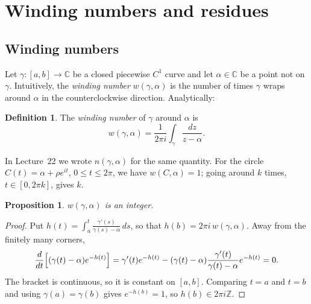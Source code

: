 \documentclass[11pt]{article}
\theoremstyle{plain}
\newtheorem{proposition}[theorem]{Proposition}
\theoremstyle{definition}
\newtheorem{definition}[theorem]{Definition}
\theoremstyle{remark}
\numberwithin{equation}{section}
\newcommand{\C}{\mathbb{C}}
\newcommand{\Z}{\mathbb{Z}}
\begin{document}
\section{Winding numbers and residues}\label{sec:winding}
\subsection{Winding numbers}
Let $\gamma\colon[a,b]\to\C$ be a closed piecewise $C^1$ curve and let
$\alpha\in\C$ be a point not on $\gamma$. Intuitively, the \emph{winding
number} $w(\gamma,\alpha)$ is the number of times $\gamma$ wraps around
$\alpha$ in the counterclockwise direction. Analytically:

\begin{definition}
The \emph{winding number} of $\gamma$ around $\alpha$ is
\begin{equation}
 w(\gamma,\alpha)=\frac{1}{2\pi i}\int_\gamma\frac{dz}{z-\alpha}.
\end{equation}
\end{definition}
In Lecture~22 we wrote $n(\gamma,\alpha)$ for the same quantity. For the
circle $C(t)=\alpha+\rho e^{it}$, $0\leq t\leq2\pi$, we have
$w(C,\alpha)=1$; going around $k$ times, $t\in[0,2\pi k]$, gives $k$.

\begin{proposition}\label{prop:winding-integer}
$w(\gamma,\alpha)$ is an integer.
\end{proposition}
\begin{proof}
Put $h(t)=\int_a^t\frac{\gamma'(s)}{\gamma(s)-\alpha}\,ds$, so that
$h(b)=2\pi i\,w(\gamma,\alpha)$. Away from the finitely many corners,
\begin{equation}
 \frac{d}{dt}\Bigl[(\gamma(t)-\alpha)e^{-h(t)}\Bigr]
 =\gamma'(t)e^{-h(t)}-(\gamma(t)-\alpha)\frac{\gamma'(t)}{\gamma(t)-\alpha}e^{-h(t)}=0.
\end{equation}
The bracket is continuous, so it is constant on $[a,b]$. Comparing $t=a$
and $t=b$ and using $\gamma(a)=\gamma(b)$ gives $e^{-h(b)}=1$, so
$h(b)\in2\pi i\Z$.
\end{proof}
\end{document}
